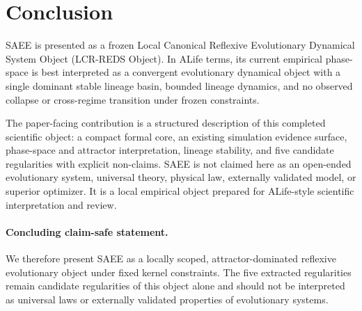 \section{Conclusion}

SAEE is presented as a frozen Local Canonical Reflexive Evolutionary Dynamical
System Object (LCR-REDS Object). In ALife terms, its current empirical
phase-space is best interpreted as a convergent evolutionary dynamical object
with a single dominant stable lineage basin, bounded lineage dynamics, and no
observed collapse or cross-regime transition under frozen constraints.

The paper-facing contribution is a structured description of this completed
scientific object: a compact formal core, an existing simulation evidence
surface, phase-space and attractor interpretation, lineage stability, and five
candidate regularities with explicit non-claims. SAEE is not claimed here as an
open-ended evolutionary system, universal theory, physical law, externally
validated model, or superior optimizer. It is a local empirical object prepared
for ALife-style scientific interpretation and review.

\paragraph{Concluding claim-safe statement.}
We therefore present SAEE as a locally scoped, attractor-dominated reflexive
evolutionary object under fixed kernel constraints. The five extracted
regularities remain candidate regularities of this object alone and should not
be interpreted as universal laws or externally validated properties of
evolutionary systems.
